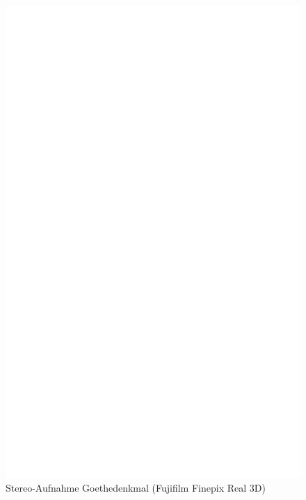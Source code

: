 \documentclass[liststotoc,bibtotoc,fontsize=14pt,]{scrreprt}
\begin{document}
	 \newpage
	 \begin{figure}[h]
 	 	\includegraphics[width=\linewidth]{img/ph.jpg}
 	 	\caption{Stereo-Aufnahme Goethedenkmal (Fujifilm Finepix Real 3D)}
	 \end{figure}

	
\end{document}
